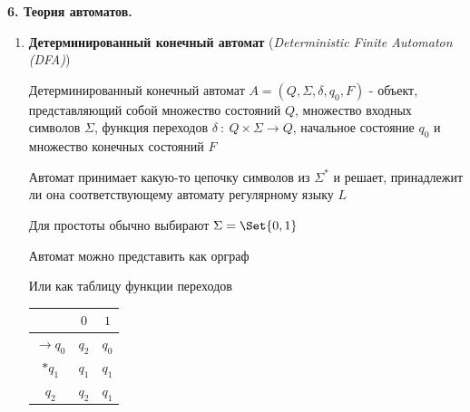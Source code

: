 \documentclass[12pt]{article}
\begin{document}
    \begin{center}
        \textbf{6. Теория автоматов.}
    \end{center}




    \begin{enumerate}
        \item \textbf{Детерминированный конечный автомат} (\textit{Deterministic Finite Automaton (DFA)})

        Детерминированный конечный автомат $A = (Q, \Sigma, \delta, q_0, F)$ - объект, представляющий собой множество состояний $Q$, множество входных символов $\Sigma$,
        функция переходов $\delta \ : \ Q \times \Sigma \to Q$, начальное состояние $q_0$ и множество конечных состояний $F$

        Автомат принимает какую-то цепочку символов из $\Sigma^*$ и решает, принадлежит ли она соответствующему автомату регулярному языку $L$

        Для простоты обычно выбирают $\Sigma = \Set{0, 1}$

        Автомат можно представить как орграф


        Или как таблицу функции переходов

        \begin{tabular}{c|cc}
            & $0$   & $1$   \\
            \hline
            $\to q_0$ & $q_2$ & $q_0$ \\
            \hline
            $*q_1$    & $q_1$ & $q_1$ \\
            \hline
            $q_2$     & $q_2$ & $q_1$
        \end{tabular}


\end{enumerate}
\end{document}
